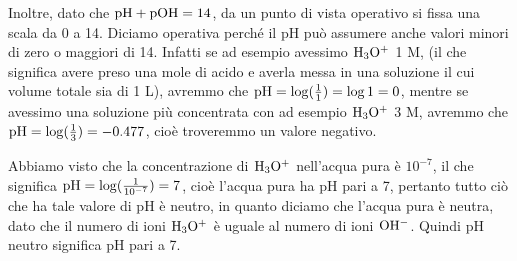 \vspace{0.2cm}Inoltre, dato che $\rm pH + pOH = 14$, da un punto di vista operativo si fissa una scala da 0 a 14. Diciamo operativa perché il pH può assumere anche valori minori di zero o maggiori di 14. Infatti se ad esempio avessimo $\rm H_3O^+$ 1 M, (il che significa avere preso una mole di acido e averla messa in una soluzione il cui volume totale sia di 1 L), avremmo che $\rm pH=\log(\frac{1}{1})=\log{1}=0$, mentre se avessimo una soluzione più concentrata con ad esempio $\rm H_3O^+$ 3 M, avremmo che $\rm pH=\log(\frac{1}{3})=-0.477$, cioè troveremmo un valore negativo.

\vspace{0.3cm}

\begin{center}
\end{center}


Abbiamo visto che la concentrazione di $\rm H_3O^+$ nell'acqua pura è $10^{-7}$, il che significa $\rm pH=\log(\frac{1}{10^{-7}})=7$, cioè l'acqua pura ha pH pari a 7, pertanto tutto ciò che ha tale valore di pH è neutro, in quanto diciamo che l'acqua pura è neutra, dato che il numero di ioni $\rm H_3O^+$ è uguale al numero di ioni $\rm OH^-$. Quindi pH neutro significa pH pari a 7.

